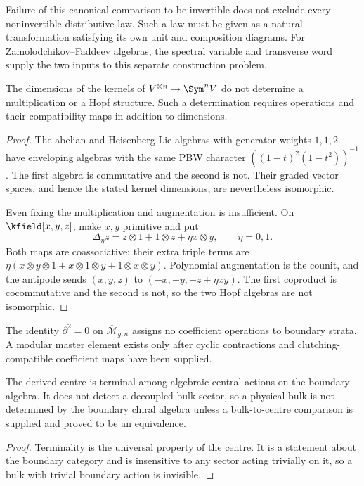 Failure of this canonical comparison to be invertible does not exclude
every noninvertible distributive law. Such a law must be given as a
natural transformation satisfying its own unit and composition diagrams.
For Zamolodchikov--Faddeev algebras, the spectral variable and transverse
word supply the two inputs to this separate construction problem.

\begin{theorem}
\label{nogo:dimension-loss-spine}
The dimensions of the kernels of $V^{\otimes n}\to\Sym^nV$ do not
determine a multiplication or a Hopf structure. Such a determination
requires operations and their compatibility maps in addition to dimensions.
\end{theorem}
\begin{proof}
The abelian and Heisenberg Lie algebras with generator weights $1,1,2$
have enveloping algebras with the same PBW character
$((1-t)^2(1-t^2))^{-1}$.
The first algebra is commutative and the second is not.
Their graded vector spaces, and hence the stated kernel dimensions,
are nevertheless isomorphic.

Even fixing the multiplication and augmentation is insufficient.
On $\kfield[x,y,z]$, make $x,y$ primitive and put
\[
 \Delta_\eta z=z\otimes1+1\otimes z+\eta x\otimes y,
 \qquad \eta=0,1.
\]
Both maps are coassociative: their extra triple terms are
$\eta(x\otimes y\otimes1+x\otimes1\otimes y+1\otimes x\otimes y)$.
Polynomial augmentation is the counit, and the antipode sends
$(x,y,z)$ to $(-x,-y,-z+\eta xy)$.
The first coproduct is cocommutative and the second is not, so the
two Hopf algebras are not isomorphic.
\end{proof}

\begin{theorem}
The identity $\partial^2=0$ on $\overline{\mathcal M}_{g,n}$ assigns no
coefficient operations to boundary strata. A modular master element exists only
after cyclic contractions and clutching-compatible coefficient maps have been
supplied.
\end{theorem}

\begin{theorem}
The derived centre is terminal among algebraic central actions on the boundary
algebra. It does not detect a decoupled bulk sector, so a physical bulk is not
determined by the boundary chiral algebra unless a bulk-to-centre comparison is
supplied and proved to be an equivalence.
\end{theorem}
\begin{proof}
Terminality is the universal property of the centre. It is a statement about
the boundary category and is insensitive to any sector acting trivially on it,
so a bulk with trivial boundary action is invisible.
\end{proof}

